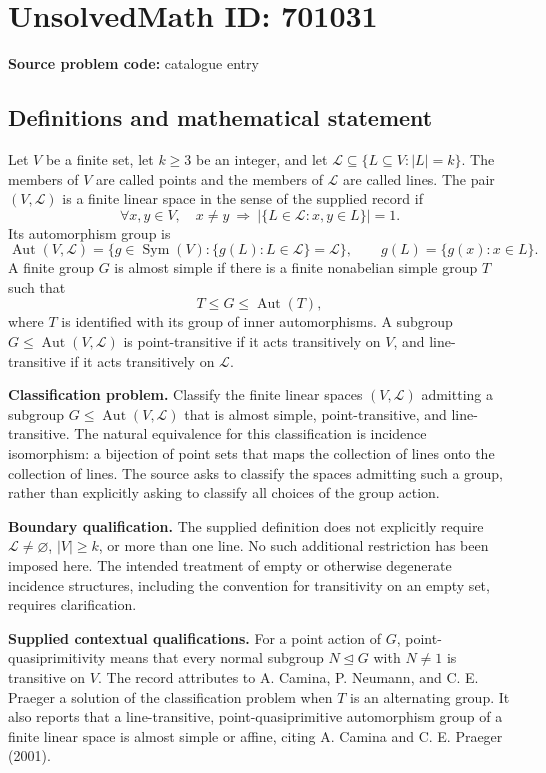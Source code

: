 \documentclass[11pt]{article}
\begin{document}
\section*{UnsolvedMath ID: 701031}
\textbf{Source problem code:} catalogue entry
\subsection{Definitions and mathematical statement}
Let \(V\) be a finite set, let \(k\geq 3\) be an integer, and let \(\mathcal L\subseteq\{L\subseteq V:|L|=k\}\). The members of \(V\) are called points and the members of \(\mathcal L\) are called lines. The pair \((V,\mathcal L)\) is a finite linear space in the sense of the supplied record if
\[
\forall x,y\in V,\quad x\neq y\ \Longrightarrow\ \bigl|\{L\in\mathcal L:x,y\in L\}\bigr|=1.
\]
Its automorphism group is
\[
\operatorname{Aut}(V,\mathcal L)=\{g\in\operatorname{Sym}(V):\{g(L):L\in\mathcal L\}=\mathcal L\},
\qquad g(L)=\{g(x):x\in L\}.
\]
A finite group \(G\) is almost simple if there is a finite nonabelian simple group \(T\) such that
\[
T\leq G\leq\operatorname{Aut}(T),
\]
where \(T\) is identified with its group of inner automorphisms. A subgroup \(G\leq\operatorname{Aut}(V,\mathcal L)\) is point-transitive if it acts transitively on \(V\), and line-transitive if it acts transitively on \(\mathcal L\).

\textbf{Classification problem.} Classify the finite linear spaces \((V,\mathcal L)\) admitting a subgroup \(G\leq\operatorname{Aut}(V,\mathcal L)\) that is almost simple, point-transitive, and line-transitive. The natural equivalence for this classification is incidence isomorphism: a bijection of point sets that maps the collection of lines onto the collection of lines. The source asks to classify the spaces admitting such a group, rather than explicitly asking to classify all choices of the group action.

\textbf{Boundary qualification.} The supplied definition does not explicitly require \(\mathcal L\neq\varnothing\), \(|V|\geq k\), or more than one line. No such additional restriction has been imposed here. The intended treatment of empty or otherwise degenerate incidence structures, including the convention for transitivity on an empty set, requires clarification.

\textbf{Supplied contextual qualifications.} For a point action of \(G\), point-quasiprimitivity means that every normal subgroup \(N\trianglelefteq G\) with \(N\neq 1\) is transitive on \(V\). The record attributes to A. Camina, P. Neumann, and C. E. Praeger a solution of the classification problem when \(T\) is an alternating group. It also reports that a line-transitive, point-quasiprimitive automorphism group of a finite linear space is almost simple or affine, citing A. Camina and C. E. Praeger (2001).
\end{document}
